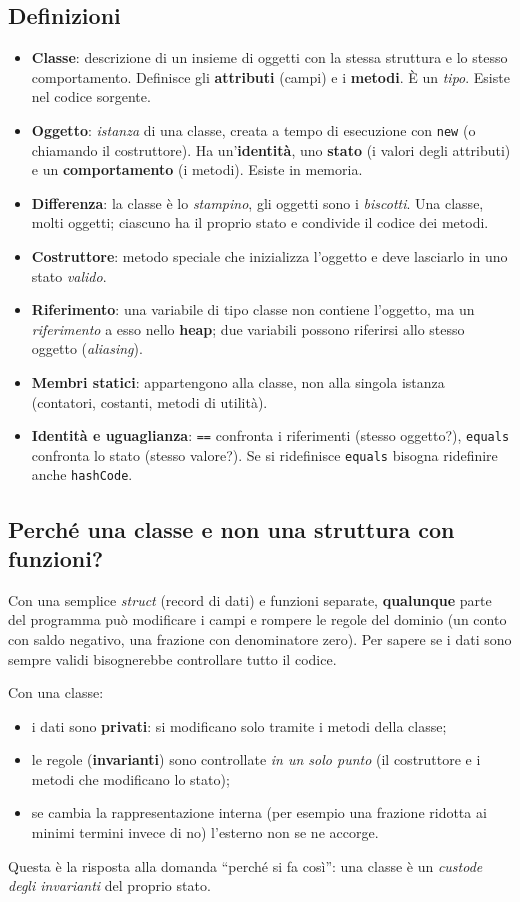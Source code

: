 \subsection{Definizioni}
\begin{itemize}
    \item \textbf{Classe}: descrizione di un insieme di oggetti con la stessa struttura e lo stesso comportamento. Definisce gli \textbf{attributi} (campi) e i \textbf{metodi}. È un \emph{tipo}. Esiste nel codice sorgente.
    \item \textbf{Oggetto}: \emph{istanza} di una classe, creata a tempo di esecuzione con \texttt{new} (o chiamando il costruttore). Ha un'\textbf{identità}, uno \textbf{stato} (i valori degli attributi) e un \textbf{comportamento} (i metodi). Esiste in memoria.
    \item \textbf{Differenza}: la classe è lo \emph{stampino}, gli oggetti sono i \emph{biscotti}. Una classe, molti oggetti; ciascuno ha il proprio stato e condivide il codice dei metodi.
    \item \textbf{Costruttore}: metodo speciale che inizializza l'oggetto e deve lasciarlo in uno stato \emph{valido}.
    \item \textbf{Riferimento}: una variabile di tipo classe non contiene l'oggetto, ma un \emph{riferimento} a esso nello \textbf{heap}; due variabili possono riferirsi allo stesso oggetto (\emph{aliasing}).
    \item \textbf{Membri statici}: appartengono alla classe, non alla singola istanza (contatori, costanti, metodi di utilità).
    \item \textbf{Identità e uguaglianza}: \texttt{==} confronta i riferimenti (stesso oggetto?), \texttt{equals} confronta lo stato (stesso valore?). Se si ridefinisce \texttt{equals} bisogna ridefinire anche \texttt{hashCode}.
\end{itemize}

\subsection{Perché una classe e non una struttura con funzioni?}
Con una semplice \emph{struct} (record di dati) e funzioni separate, \textbf{qualunque} parte del programma può modificare i campi e rompere le regole del dominio (un conto con saldo negativo, una frazione con denominatore zero). Per sapere se i dati sono sempre validi bisognerebbe controllare tutto il codice.

Con una classe:
\begin{itemize}
    \item i dati sono \textbf{privati}: si modificano solo tramite i metodi della classe;
    \item le regole (\textbf{invarianti}) sono controllate \emph{in un solo punto} (il costruttore e i metodi che modificano lo stato);
    \item se cambia la rappresentazione interna (per esempio una frazione ridotta ai minimi termini invece di no) l'esterno non se ne accorge.
\end{itemize}
Questa è la risposta alla domanda ``perché si fa così'': una classe è un \emph{custode degli invarianti} del proprio stato.

